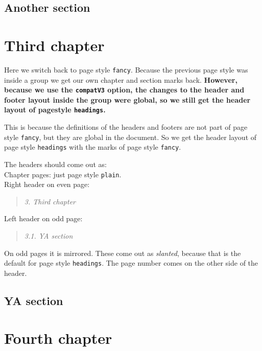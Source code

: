 \documentclass[openany]{book}
\begin{document}
\lipsum[1]

\section{Another section}

\lipsum

\newpage
\endgroup
\pagestyle{fancy}
\chapter{Third chapter}

\noindent
\begin{boxedminipage}{\textwidth}
Here we switch back to page style \texttt{fancy}. Because the previous page style was inside a group we get our own chapter and section marks back.
\textbf{However, because we use the \texttt{compatV3} option, the changes to the header and footer layout inside the group were global, so we still get the header layout of pagestyle \texttt{headings}.}

This is because the definitions of the headers and footers are not part of page style \texttt{fancy}, but they are global in the document.
So we get the header layout of page style \texttt{headings} with the marks of page style \texttt{fancy}.

The headers should come out as:
\\
Chapter pages: just page style \texttt{plain}.
\\
Right header on even page:
\begin{quote}

  \textsl{3. Third chapter}
\end{quote}
Left header on odd page:
\begin{quote}
  \textsl{3.1. YA section}
\end{quote}
On odd pages it is mirrored.
These come out as \textsl{slanted}, because that is the default for page style \texttt{headings}.
The page number comes on the other side of the header.
\end{boxedminipage}
\bigskip

\lipsum[1]

\section{YA section}

\lipsum

\newpage
\pagestyle{myfancy}
\chapter{Fourth chapter}
\end{document}
